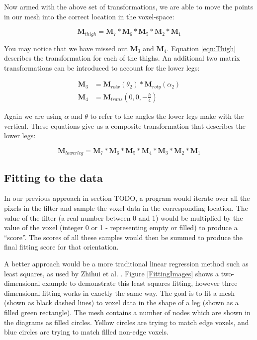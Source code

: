 Now armed with the above set of transformations, we are able to move the points in our mesh into the correct location in the voxel-space:

\begin{equation}
	\label{eqn:Thigh} \mathbf{M}_{thigh} = \mathbf{M}_{7} * \mathbf{M}_{6} * \mathbf{M}_{5} * \mathbf{M}_{2} * \mathbf{M}_{1}
\end{equation}

You may notice that we have missed out $\mathbf{M}_{3}$ and $\mathbf{M}_{4}$.
Equation \ref{eqn:Thigh} describes the transformation for each of the thighs.
An additional two matrix transformations can be introduced to account for the lower legs:

\begin{align}
	\mathbf{M}_{3} &= \mathbf{M}_{rotx}(\theta_{2}) * \mathbf{M}_{roty}(\alpha_{2}) \\
	\mathbf{M}_{4} &= \mathbf{M}_{trans}(0, 0, -\frac{h}{4})
\end{align}

Again we are using $\alpha$ and $\theta$ to refer to the angles the lower legs make with the vertical.
These equations give us a composite transformation that describes the lower legs:

\begin{equation}
	\label{eqn:LowerLegs} \mathbf{M}_{lowerleg} = \mathbf{M}_{7} * \mathbf{M}_{6} * \mathbf{M}_{5} * \mathbf{M}_{4} * \mathbf{M}_{3} * \mathbf{M}_{2} * \mathbf{M}_{1}
\end{equation}



\subsection{Fitting to the data}

In our previous approach in section TODO, a program would iterate over all the pixels in the filter and sample the
voxel data in the corresponding location.
The value of the filter (a real number between 0 and 1) would be multiplied by the value of the voxel (integer 0 or 1 - representing empty or filled) to produce a ``score''.
The scores of all these samples would then be summed to produce the final fitting score for that orientation.

A better approach would be a more traditional linear regression method such as least squares, as used by Zhihui et al. \cite{LinearModelFitting}.
Figure \ref{FittingImages} shows a two-dimensional example to demonstrate this least squares fitting, however three dimensional fitting works in exactly the same way.
The goal is to fit a mesh (shown as black dashed lines) to voxel data in the shape of a leg (shown as a filled green rectangle).
The mesh contains a number of nodes which are shown in the diagrams as filled circles.
Yellow circles are trying to match edge voxels, and blue circles are trying to match filled non-edge voxels.

